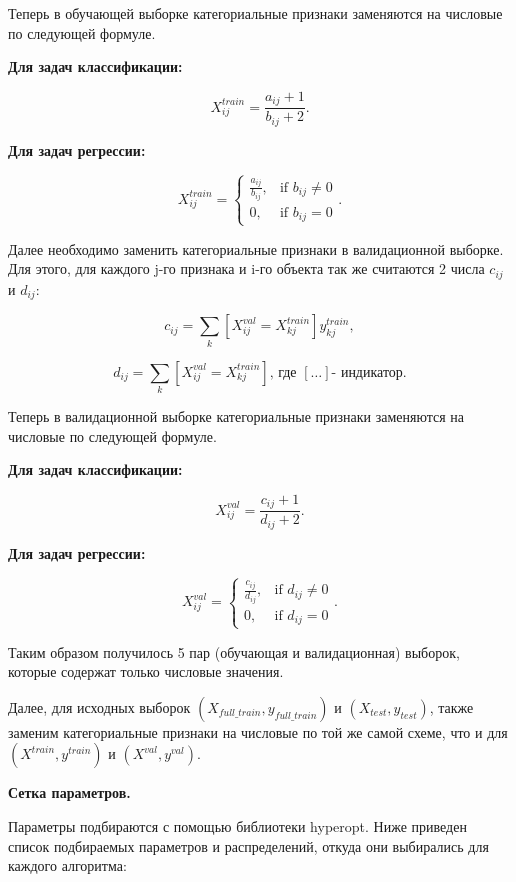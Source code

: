 \documentclass{article}
\begin{document}
Теперь в обучающей выборке категориальные признаки заменяются на числовые по следующей формуле.

\textbf{Для задач классификации:}

$$X^{train}_{ij} = \frac{a_{ij} + 1}{b_{ij} + 2}.$$

\textbf{Для задач регрессии:}

$$X^{train}_{ij} = \begin{cases} \frac{a_{ij}}{b_{ij}}, & \mbox{if } b_{ij} \neq 0  \\ 0, & \mbox{if } b_{ij} = 0 \end{cases}.$$

Далее необходимо заменить категориальные признаки в валидационной выборке. Для этого, для каждого j-го признака и i-го объекта так же считаются 2 числа $c_{ij}$ и $d_{ij}$:

$$c_{ij} = \sum_{k}[X^{val}_{ij} = X^{train}_{kj}]y^{train}_{kj},$$

$$d_{ij} = \sum_{k}[X^{val}_{ij} = X^{train}_{kj}] \text{, где } [\dots] \text{- индикатор.}$$

Теперь в валидационной выборке категориальные признаки заменяются на числовые по следующей формуле.

\textbf{Для задач классификации:}

$$X^{val}_{ij} = \frac{c_{ij} + 1}{d_{ij} + 2}.$$

\textbf{Для задач регрессии:}

$$X^{val}_{ij} = \begin{cases} \frac{c_{ij}}{d_{ij}}, & \mbox{if } d_{ij} \neq 0  \\ 0, & \mbox{if } d_{ij} = 0 \end{cases}.$$


Таким образом получилось 5 пар (обучающая и валидационная) выборок, которые содержат только числовые значения.

Далее, для исходных выборок $(X_{full\_train}, y_{full\_train})$ и $(X_{test}, y_{test})$, также заменим категориальные признаки на числовые по той же самой схеме, что и для $(X^{train}, y^{train})$ и $(X^{val}, y^{val})$.

\medskip
\noindent\textbf{Сетка параметров.}
\medskip

Параметры подбираются с помощью библиотеки hyperopt. Ниже приведен список подбираемых параметров и распределений, откуда они выбирались для каждого алгоритма:
\end{document}

